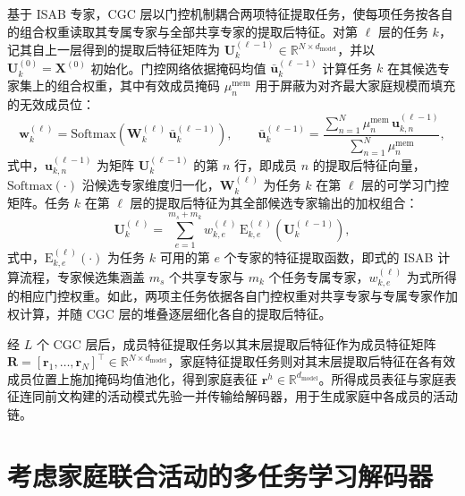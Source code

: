 基于 ISAB 专家，CGC 层以门控机制耦合两项特征提取任务，使每项任务按各自的组合权重读取其专属专家与全部共享专家的提取后特征。对第 $\ell$ 层的任务 $k$，记其自上一层得到的提取后特征矩阵为 $\mathbf{U}_k^{(\ell-1)}\in\mathbb{R}^{N\times d_{\text{model}}}$，并以 $\mathbf{U}_k^{(0)}=\mathbf{X}^{(0)}$ 初始化。门控网络依据掩码均值 $\bar{\mathbf{u}}_k^{(\ell-1)}$ 计算任务 $k$ 在其候选专家集上的组合权重，其中有效成员掩码 $\mu_n^{\text{mem}}$ 用于屏蔽为对齐最大家庭规模而填充的无效成员位：
\begin{equation}
\mathbf{w}_k^{(\ell)}=\mathrm{Softmax}\!\left(\mathbf{W}_k^{(\ell)}\,\bar{\mathbf{u}}_k^{(\ell-1)}\right),\qquad \bar{\mathbf{u}}_k^{(\ell-1)}=\frac{\sum_{n=1}^{N}\mu_n^{\text{mem}}\,\mathbf{u}_{k,n}^{(\ell-1)}}{\sum_{n=1}^{N}\mu_n^{\text{mem}}},
\label{eq.cohact.gate}
\end{equation}
式中，$\mathbf{u}_{k,n}^{(\ell-1)}$ 为矩阵 $\mathbf{U}_k^{(\ell-1)}$ 的第 $n$ 行，即成员 $n$ 的提取后特征向量，$\mathrm{Softmax}(\cdot)$ 沿候选专家维度归一化，$\mathbf{W}_k^{(\ell)}$ 为任务 $k$ 在第 $\ell$ 层的可学习门控矩阵。任务 $k$ 在第 $\ell$ 层的提取后特征为其全部候选专家输出的加权组合：
\begin{equation}
\mathbf{U}_k^{(\ell)}=\sum_{e=1}^{m_s+m_k} w_{k,e}^{(\ell)}\,\mathrm{E}_{k,e}^{(\ell)}\!\left(\mathbf{U}_k^{(\ell-1)}\right),
\label{eq.cohact.cgc}
\end{equation}
式中，$\mathrm{E}_{k,e}^{(\ell)}(\cdot)$ 为任务 $k$ 可用的第 $e$ 个专家的特征提取函数，即式的 ISAB 计算流程，专家候选集涵盖 $m_s$ 个共享专家与 $m_k$ 个任务专属专家，$w_{k,e}^{(\ell)}$ 为式所得的相应门控权重。如此，两项主任务依据各自门控权重对共享专家与专属专家作加权计算，并随 CGC 层的堆叠逐层细化各自的提取后特征。

经 $L$ 个 CGC 层后，成员特征提取任务以其末层提取后特征作为成员特征矩阵 $\mathbf{R}=[\mathbf{r}_1,\dots,\mathbf{r}_N]^{\top}\in\mathbb{R}^{N\times d_{\text{model}}}$，家庭特征提取任务则对其末层提取后特征在各有效成员位置上施加掩码均值池化，得到家庭表征 $\mathbf{r}^h\in\mathbb{R}^{d_{\text{model}}}$。所得成员表征与家庭表征连同前文构建的活动模式先验一并传输给解码器，用于生成家庭中各成员的活动链。
 
\section{考虑家庭联合活动的多任务学习解码器}\label{sec.cohact.decoder}

